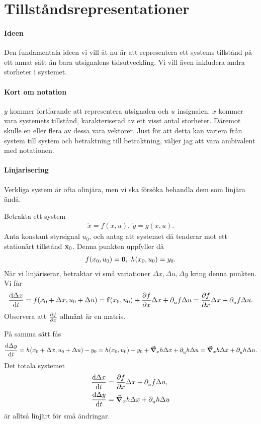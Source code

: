 \section{Tillståndsrepresentationer}

\paragraph{Ideen}
Den fundamentala ideen vi vill åt nu är att representera ett systems tillstånd på ett annat sätt än bara utsignalens tidsutveckling. Vi vill även inkludera andra storheter i systemet.

\paragraph{Kort om notation}
$y$ kommer fortfarande att representera utsignalen och $u$ insignalen. $x$ kommer vara systemets tillstånd, karakteriserad av ett visst antal storheter. Däremot skulle en eller flera av dessa vara vektorer. Just för att detta kan variera från system till system och betraktning till betraktning, väljer jag att vara ambivalent med notationen.

\paragraph{Linjarisering}
Verkliga system är ofta olinjära, men vi ska försöka behandla dem som linjära ändå.

Betrakta ett system
\begin{align*}
	\dot{x} = f(x, u),\ \dot{y} = g(x, u).
\end{align*}
Anta konstant styrsignal $u_{0}$, och antag att systemet då tenderar mot ett stationärt tillstånd $\vb{x}_{0}$. Denna punkten uppfyller då
\begin{align*}
	f(x_{0}, u_{0}) = \vb{0},\ h(x_{0}, u_{0}) = y_{0}.
\end{align*}
När vi linjäriserar, betraktar vi små variationer $\Delta x, \Delta u, \Delta y$ kring denna punkten. Vi får
\begin{align*}
	\dv{\Delta x}{t} = f(x_{0} + \Delta x, u_{0} + \Delta u) = \vb{f}(x_{0}, u_{0}) + \pdv{f}{x}\Delta x + \partial_{u}^{}f\Delta u = \pdv{f}{x}\Delta x + \partial_{u}^{}f\Delta u.
\end{align*}
Observera att $\pdv{f}{x}$ allmänt är en matris.

På samma sätt fås
\begin{align*}
	\dv{\Delta y}{t} = h(x_{0} + \Delta x, u_{0} + \Delta u) - y_{0} = h(x_{0}, u_{0}) - y_{0} + \grad_{x}{h}\Delta x + \partial_{u}^{}h\Delta u = \grad_{x}{h}\Delta x + \partial_{u}^{}h\Delta u.
\end{align*}
Det totala systemet
\begin{align*}
	\dv{\Delta x}{t} &= \pdv{f}{x}\Delta x + \partial_{u}^{}f\Delta u, \\
	\dv{\Delta y}{t}     &= \grad_{x}{h}\Delta x + \partial_{u}^{}h\Delta u
\end{align*}
är alltså linjärt för små ändringar.

